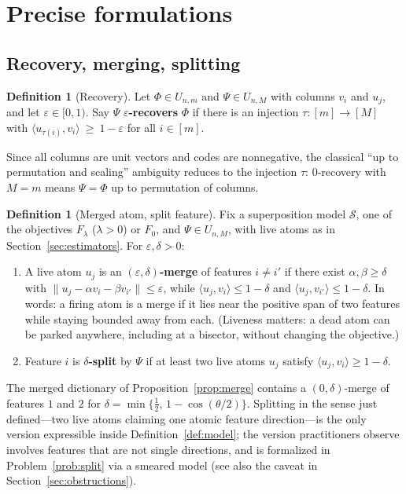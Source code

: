 \documentclass[11pt]{amsart}
\theoremstyle{plain}
\theoremstyle{definition}
\newtheorem{definition}[theorem]{Definition}
\begin{document}
\section{Precise formulations}\label{sec:formulations}

\subsection{Recovery, merging, splitting}

\begin{definition}[Recovery]\label{def:recover}
Let $\Phi\in U_{n,m}$ and $\Psi\in U_{n,M}$ with columns $v_i$ and $u_j$, and let $\varepsilon\in[0,1)$. Say $\Psi$ \textbf{$\varepsilon$-recovers} $\Phi$ if there is an injection $\tau:[m]\to[M]$ with
$\langle u_{\tau(i)},v_i\rangle\ \ge\ 1-\varepsilon$ for all $i\in[m]$.
\end{definition}

Since all columns are unit vectors and codes are nonnegative, the classical ``up to permutation and scaling'' ambiguity reduces to the injection $\tau$: $0$-recovery with $M=m$ means $\Psi=\Phi$ up to permutation of columns.

\begin{definition}[Merged atom, split feature]\label{def:mergesplit}
Fix a superposition model $\mathcal S$, one of the objectives $F_\lambda$ ($\lambda>0$) or $F_0$, and $\Psi\in U_{n,M}$, with live atoms as in Section~\ref{sec:estimators}. For $\varepsilon,\delta>0$:
\begin{enumerate}
\item A live atom $u_j$ is an \textbf{$(\varepsilon,\delta)$-merge} of features $i\neq i'$ if there exist $\alpha,\beta\ge\delta$ with $\lVert u_j-\alpha v_i-\beta v_{i'}\rVert\le\varepsilon$, while $\langle u_j,v_i\rangle\le1-\delta$ and $\langle u_j,v_{i'}\rangle\le1-\delta$. In words: a firing atom is a merge if it lies near the positive span of two features while staying bounded away from each. (Liveness matters: a dead atom can be parked anywhere, including at a bisector, without changing the objective.)
\item Feature $i$ is \textbf{$\delta$-split} by $\Psi$ if at least two live atoms $u_j$ satisfy $\langle u_j,v_i\rangle\ge1-\delta$.
\end{enumerate}
\end{definition}

The merged dictionary of Proposition~\ref{prop:merge} contains a $(0,\delta)$-merge of features $1$ and $2$ for $\delta=\min\{\tfrac12,\,1-\cos(\theta/2)\}$. Splitting in the sense just defined---two live atoms claiming one atomic feature direction---is the only version expressible inside Definition~\ref{def:model}; the version practitioners observe involves features that are not single directions, and is formalized in Problem~\ref{prob:split} via a smeared model (see also the caveat in Section~\ref{sec:obstructions}).
\end{document}
